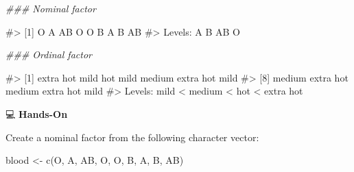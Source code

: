 \documentclass[
  letterpaper,
  DIV=11,
  numbers=noendperiod]{scrreprt}
\newenvironment{Shaded}{\begin{snugshade}}{\end{snugshade}}
\newcommand{\CommentTok}[1]{\textcolor[rgb]{0.37,0.37,0.37}{#1}}
\newcommand{\DocumentationTok}[1]{\textcolor[rgb]{0.37,0.37,0.37}{\textit{#1}}}
\newcommand{\FunctionTok}[1]{\textcolor[rgb]{0.28,0.35,0.67}{#1}}
\newcommand{\NormalTok}[1]{\textcolor[rgb]{0.00,0.23,0.31}{#1}}
\newcommand{\OtherTok}[1]{\textcolor[rgb]{0.00,0.23,0.31}{#1}}
\newcommand{\StringTok}[1]{\textcolor[rgb]{0.13,0.47,0.30}{#1}}
\begin{document}
\begin{Shaded}
\begin{Highlighting}[]
\DocumentationTok{\#\#\# Nominal factor}

\CommentTok{\#\textgreater{} [1] O  A  AB O  O  B  A  B  AB}
\CommentTok{\#\textgreater{} Levels: A B AB O}

\DocumentationTok{\#\#\# Ordinal factor}

\CommentTok{\#\textgreater{}  [1] extra hot mild      hot       mild      medium    extra hot mild     }
\CommentTok{\#\textgreater{}  [8] medium    extra hot medium    extra hot mild     }
\CommentTok{\#\textgreater{} Levels: mild \textless{} medium \textless{} hot \textless{} extra hot}
\end{Highlighting}
\end{Shaded}

💻 \textbf{Hands-On}

Create a nominal factor from the following character vector:

\begin{Shaded}
\begin{Highlighting}[]
\NormalTok{blood }\OtherTok{\textless{}{-}} \FunctionTok{c}\NormalTok{(}\StringTok{\textquotesingle{}O\textquotesingle{}}\NormalTok{, }\StringTok{\textquotesingle{}A\textquotesingle{}}\NormalTok{, }\StringTok{\textquotesingle{}AB\textquotesingle{}}\NormalTok{, }\StringTok{\textquotesingle{}O\textquotesingle{}}\NormalTok{, }\StringTok{\textquotesingle{}O\textquotesingle{}}\NormalTok{, }\StringTok{\textquotesingle{}B\textquotesingle{}}\NormalTok{, }\StringTok{\textquotesingle{}A\textquotesingle{}}\NormalTok{, }\StringTok{\textquotesingle{}B\textquotesingle{}}\NormalTok{, }\StringTok{\textquotesingle{}AB\textquotesingle{}}\NormalTok{)}
\end{Highlighting}
\end{Shaded}
\end{document}

